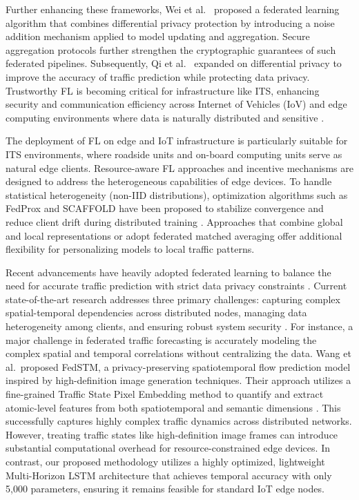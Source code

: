 \documentclass[pdflatex,sn-mathphys-num]{sn-jnl}
\theoremstyle{thmstyleone}
\theoremstyle{thmstyletwo}
\theoremstyle{thmstylethree}
\begin{document}
Further enhancing these frameworks, Wei et al.\ \cite{Wei2020FLDP} proposed a federated learning algorithm that combines differential privacy protection \cite{dwork2014differential} by introducing a noise addition mechanism applied to model updating and aggregation. Secure aggregation protocols \cite{bonawitz2017secagg} further strengthen the cryptographic guarantees of such federated pipelines. Subsequently, Qi et al.\ \cite{Qi2020BlockchainFLTraffic} expanded on differential privacy to improve the accuracy of traffic prediction while protecting data privacy. Trustworthy FL \cite{tariq2024trustworthy} is becoming critical for infrastructure like ITS, enhancing security and communication efficiency across Internet of Vehicles (IoV) and edge computing environments where data is naturally distributed and sensitive \cite{nguyen2021federated}.

The deployment of FL on edge and IoT infrastructure \cite{shi2016edge,mach2017mobile} is particularly suitable for ITS environments, where roadside units and on-board computing units serve as natural edge clients. Resource-aware FL approaches and incentive mechanisms \cite{yuan2021federated} are designed to address the heterogeneous capabilities of edge devices. To handle statistical heterogeneity (non-IID distributions), optimization algorithms such as FedProx \cite{li2020fedprox} and SCAFFOLD \cite{karimireddy2020scaffold} have been proposed to stabilize convergence and reduce client drift during distributed training \cite{sun2021pain}. Approaches that combine global and local representations \cite{liang2020think} or adopt federated matched averaging \cite{wang2019adaptive} offer additional flexibility for personalizing models to local traffic patterns.

Recent advancements have heavily adopted federated learning to balance the need for accurate traffic prediction with strict data privacy constraints \cite{liu2020fedgru,feng2024federated,zhang2024personalized}. Current state-of-the-art research addresses three primary challenges: capturing complex spatial-temporal dependencies across distributed nodes, managing data heterogeneity among clients, and ensuring robust system security \cite{tariq2024trustworthy}. For instance, a major challenge in federated traffic forecasting is accurately modeling the complex spatial and temporal correlations without centralizing the data. Wang et al.\ proposed FedSTM, a privacy-preserving spatiotemporal flow prediction model inspired by high-definition image generation techniques. Their approach utilizes a fine-grained Traffic State Pixel Embedding method to quantify and extract atomic-level features from both spatiotemporal and semantic dimensions \cite{sttn2024}. This successfully captures highly complex traffic dynamics across distributed networks. However, treating traffic states like high-definition image frames can introduce substantial computational overhead for resource-constrained edge devices. In contrast, our proposed methodology utilizes a highly optimized, lightweight Multi-Horizon LSTM architecture \cite{hochreiter1997lstm} that achieves temporal accuracy with only 5,000 parameters, ensuring it remains feasible for standard IoT edge nodes.
\end{document}
